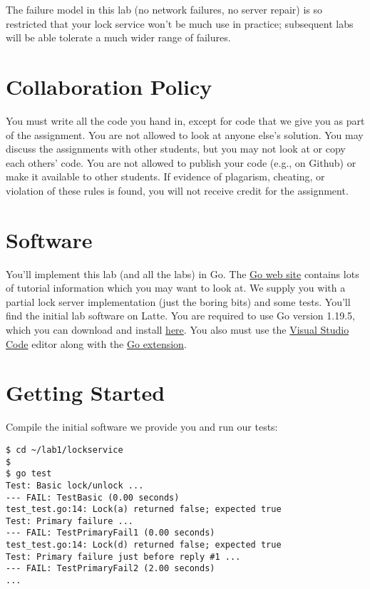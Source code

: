 \documentclass{article}
\begin{document}
The failure model in this lab (no network failures, no server repair) is so restricted that your lock service won't be much use in practice; subsequent labs will be able tolerate a much wider range of failures.

\section{Collaboration Policy}
You must write all the code you hand in, except for code that we give you as part of the assignment. You are not allowed to look at anyone else's solution. You may discuss the assignments with other students, but you may not look at or copy each others' code. You are not allowed to publish your code (e.g., on Github) or make it available to other students. If evidence of plagarism, cheating, or violation of these rules is found, you will not receive credit for the assignment.

\section{Software}
You'll implement this lab (and all the labs) in Go. The \href{https://go.dev/learn/}{Go web site} contains lots of tutorial information which you may want to look at. We supply you with a partial lock server implementation (just the boring bits) and some tests. You'll find the initial lab software on Latte.
You are required to use Go version 1.19.5, which you can download and install \href{https://go.dev/doc/install}{here}.
You also must use the \href{https://code.visualstudio.com/download}{Visual Studio Code} editor along with the \href{https://code.visualstudio.com/docs/languages/go}{Go extension}.

\section{Getting Started}
Compile the initial software we provide you and run our tests:

\begin{lstlisting}
$ cd ~/lab1/lockservice
$
$ go test
Test: Basic lock/unlock ...
--- FAIL: TestBasic (0.00 seconds)
test_test.go:14: Lock(a) returned false; expected true
Test: Primary failure ...
--- FAIL: TestPrimaryFail1 (0.00 seconds)
test_test.go:14: Lock(d) returned false; expected true
Test: Primary failure just before reply #1 ...
--- FAIL: TestPrimaryFail2 (2.00 seconds)
...
\end{lstlisting}
\end{document}
